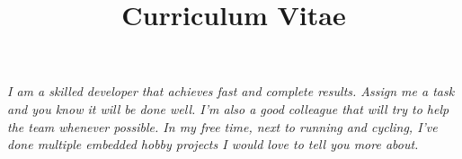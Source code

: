 \documentclass[11pt,a4paper,sans]{moderncv} %
\title{\huge{Curriculum Vitae}}
\begin{document}




\makecvtitle %


\vspace{-15pt}
\begin{adjustwidth}{50pt}{50pt}
    \textit{I am a skilled developer that achieves fast and complete results.
    Assign me a task and you know it will be done well.
    I'm also a good colleague that will try to help the team whenever possible.
    In my free time, next to running and cycling, I've done multiple embedded hobby projects I would love to tell you more about.}
\end{adjustwidth}
\vspace{10pt}

\end{document}
